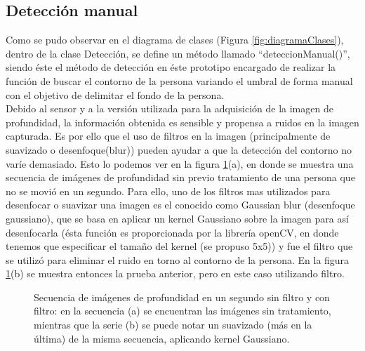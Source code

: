 \documentclass[a4paper,openright,12pt]{report}
\begin{document}
\subsection{Detección manual}
Como se pudo observar en el diagrama de clases (Figura \ref{fig:diagramaClases}), dentro de la clase Detección, se define un método llamado ``deteccionManual()'', siendo éste el método de detección en éste prototipo encargado de realizar la función de buscar el contorno de la persona variando el umbral de forma manual con el objetivo de delimitar el fondo de la persona.\\
Debido al sensor y a la versión utilizada para la adquisición de la imagen de profundidad, la información obtenida es sensible y propensa a ruidos en la imagen capturada. Es por ello que el uso de filtros en la imagen (principalmente de suavizado o desenfoque(blur)) pueden ayudar a que la detección del contorno no varíe demasiado. Esto lo podemos ver en la figura \ref{fig:filtrado}(a), en donde se muestra una secuencia de imágenes de profundidad sin previo tratamiento de una persona que no se movió en un segundo. Para ello, uno de los filtros mas utilizados para desenfocar o suavizar una imagen es el conocido como Gaussian blur (desenfoque gaussiano), que se basa en aplicar un kernel Gaussiano sobre la imagen para así desenfocarla (ésta función es proporcionada por la librería openCV, en donde tenemos que especificar el tamaño del kernel (se propuso 5x5)) y fue el filtro que se utilizó para eliminar el ruido en torno al contorno de la persona. En la figura \ref{fig:filtrado}(b) se muestra entonces la prueba anterior, pero en este caso utilizando filtro.
\begin{figure}[ht]
	\centering
	\caption[Secuencia de imágenes de profundidad en un segundo sin filtro y con filtro]{Secuencia de imágenes de profundidad en un segundo sin filtro y con filtro: en la secuencia (a) se encuentran las imágenes sin tratamiento, mientras que la serie (b) se puede notar un suavizado (más en la última) de la misma secuencia, aplicando kernel Gaussiano.} \label{fig:filtrado}
\end{figure}\\
\end{document}

